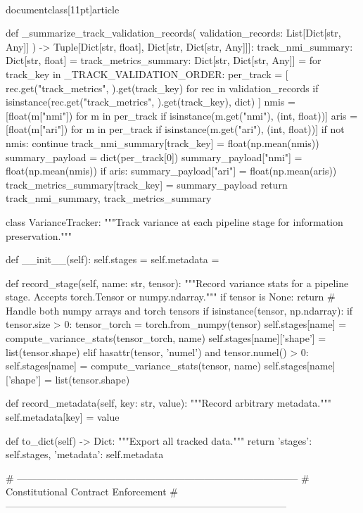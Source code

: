 \\documentclass[11pt]{article}
\begin{document}
\begin{CodeBlock}
def _summarize_track_validation_records(
    validation_records: List[Dict[str, Any]]
) -> Tuple[Dict[str, float], Dict[str, Dict[str, Any]]]:
    track_nmi_summary: Dict[str, float] = {}
    track_metrics_summary: Dict[str, Dict[str, Any]] = {}
    for track_key in _TRACK_VALIDATION_ORDER:
        per_track = [
            rec.get("track_metrics", {}).get(track_key)
            for rec in validation_records
            if isinstance(rec.get("track_metrics", {}).get(track_key), dict)
        ]
        nmis = [float(m["nmi"]) for m in per_track if isinstance(m.get("nmi"), (int, float))]
        aris = [float(m["ari"]) for m in per_track if isinstance(m.get("ari"), (int, float))]
        if not nmis:
            continue
        track_nmi_summary[track_key] = float(np.mean(nmis))
        summary_payload = dict(per_track[0])
        summary_payload["nmi"] = float(np.mean(nmis))
        if aris:
            summary_payload["ari"] = float(np.mean(aris))
        track_metrics_summary[track_key] = summary_payload
    return track_nmi_summary, track_metrics_summary


class VarianceTracker:
    """Track variance at each pipeline stage for information preservation."""
    
    def __init__(self):
        self.stages = {}
        self.metadata = {}
    
    def record_stage(self, name: str, tensor):
        """Record variance stats for a pipeline stage. Accepts torch.Tensor or numpy.ndarray."""
        if tensor is None:
            return
        # Handle both numpy arrays and torch tensors
        if isinstance(tensor, np.ndarray):
            if tensor.size > 0:
                tensor_torch = torch.from_numpy(tensor)
                self.stages[name] = compute_variance_stats(tensor_torch, name)
                self.stages[name]['shape'] = list(tensor.shape)
        elif hasattr(tensor, 'numel') and tensor.numel() > 0:
            self.stages[name] = compute_variance_stats(tensor, name)
            self.stages[name]['shape'] = list(tensor.shape)
    
    def record_metadata(self, key: str, value):
        """Record arbitrary metadata."""
        self.metadata[key] = value
    
    def to_dict(self) -> Dict:
        """Export all tracked data."""
        return {'stages': self.stages, 'metadata': self.metadata}


# --------------------------------------------------------------------------------------
# Constitutional Contract Enforcement
# --------------------------------------------------------------------------------------


\end{CodeBlock}
\end{document}
